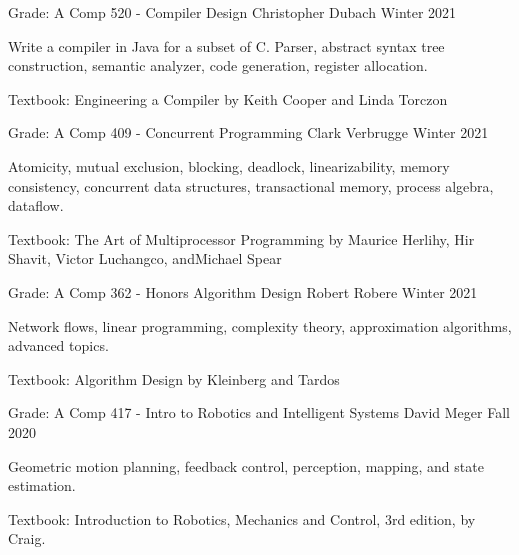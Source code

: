 

\begin{cventries}
  \cventry
  {Grade: A}
  {Comp 520 - Compiler Design}
  {Christopher Dubach}
  {Winter 2021}
  {
    \begin{cvitems} %
    \item {Write a compiler in Java for a subset of C. Parser, abstract syntax tree construction, semantic analyzer, code generation, register allocation.} 
    \item {Textbook: Engineering a Compiler by Keith Cooper and Linda Torczon}
    \end{cvitems}
  }


  \cventry
  {Grade: A}
  {Comp 409 - Concurrent Programming}
  {Clark Verbrugge}
  {Winter 2021}
  {
    \begin{cvitems} %
    \item {Atomicity, mutual exclusion, blocking, deadlock, linearizability, memory consistency, concurrent data structures, transactional memory, process algebra, dataflow.} 
    \item {Textbook: The Art of Multiprocessor Programming by Maurice Herlihy, Hir Shavit, Victor Luchangco, andMichael Spear}
    \end{cvitems}
  }


  \cventry
  {Grade: A}
  {Comp 362 - Honors Algorithm Design}
  {Robert Robere}
  {Winter 2021}
  {
    \begin{cvitems}
    \item {Network flows, linear programming, complexity theory, approximation algorithms, advanced topics.} 
    \item {Textbook: Algorithm Design by Kleinberg and Tardos}
    \end{cvitems}
  }


  \cventry
  {Grade: A}
    {Comp 417 - Intro to Robotics and Intelligent Systems}
    {David Meger}
    {Fall 2020}
    {
      \begin{cvitems} %
      \item {Geometric motion planning, feedback control, perception, mapping, and state estimation.} 
      \item {Textbook: Introduction to Robotics, Mechanics and Control, 3rd edition, by Craig.}
      \end{cvitems}
    }


\end{cventries}
